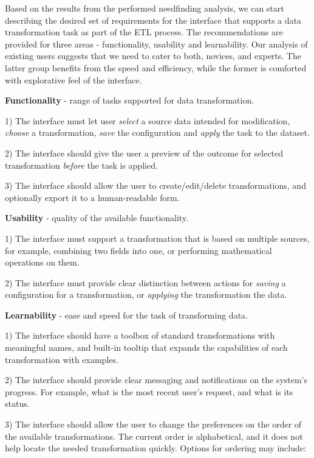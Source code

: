 \documentclass[12pt,letterpaper]{article}
\begin{document}
Based on the results from the performed needfinding analysis, we can start describing the desired set of requirements for the interface that supports a data transformation task as part of the ETL process. The recommendations are provided for three areas - functionality, usability and learnability. Our analysis of existing users suggests that we need to cater to both, novices, and experts. The latter group benefits from the speed and efficiency, while the former is comforted with explorative feel of the interface.

\bigskip
\textbf{Functionality} - range of tasks supported for data transformation.

1) The interface must let user \textit{select} a source data intended for modification, \textit{choose} a transformation, \textit{save} the configuration and \textit{apply} the task to the dataset.

2) The interface should give the user a preview of the outcome for selected transformation \textit{before} the task is applied.

3) The interface should allow the user to create/edit/delete transformations, and optionally export it to a human-readable form.

\textbf{Usability} - quality of the available functionality.

1) The interface must support a transformation that is based on multiple sources, for example, combining two fields into one, or performing mathematical operations on them.

2) The interface must provide clear distinction between actions for \textit{saving} a configuration for a transformation, or \textit{applying} the transformation the data.

\textbf{Learnability} - ease and speed for the task of transforming data.

1) The interface should have a toolbox of standard transformations with meaningful names, and built-in tooltip that expands the capabilities of each transformation with examples.

2) The interface should provide clear messaging and notifications on the system's progress. For example, what is the most recent user's request, and what is its status.

3) The interface should allow the user to change the preferences on the order of the available transformations. The current order is alphabetical, and it does not help locate the needed transformation quickly. Options for ordering may include: 
\end{document}
